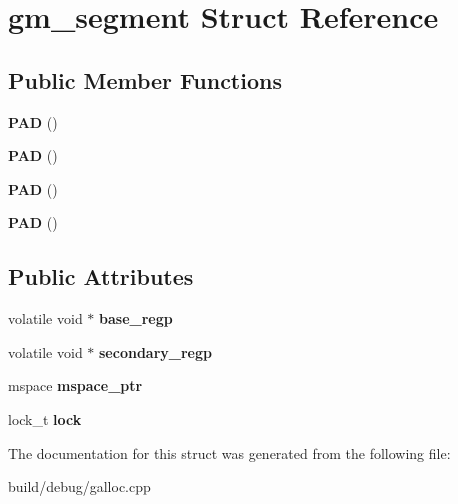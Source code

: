 \hypertarget{structgm__segment}{\section{gm\-\_\-segment Struct Reference}
\label{structgm__segment}
}
\subsection*{Public Member Functions}
\begin{DoxyCompactItemize}
\item 
\hypertarget{structgm__segment_a1ba3784ba1f090d5629cc17b2a228962}{{\bfseries P\-A\-D} ()}\label{structgm__segment_a1ba3784ba1f090d5629cc17b2a228962}

\item 
\hypertarget{structgm__segment_a1ba3784ba1f090d5629cc17b2a228962}{{\bfseries P\-A\-D} ()}\label{structgm__segment_a1ba3784ba1f090d5629cc17b2a228962}

\item 
\hypertarget{structgm__segment_a1ba3784ba1f090d5629cc17b2a228962}{{\bfseries P\-A\-D} ()}\label{structgm__segment_a1ba3784ba1f090d5629cc17b2a228962}

\item 
\hypertarget{structgm__segment_a1ba3784ba1f090d5629cc17b2a228962}{{\bfseries P\-A\-D} ()}\label{structgm__segment_a1ba3784ba1f090d5629cc17b2a228962}

\end{DoxyCompactItemize}
\subsection*{Public Attributes}
\begin{DoxyCompactItemize}
\item 
\hypertarget{structgm__segment_ac53e289c9dcab359d40d51ffca2343f1}{volatile void $\ast$ {\bfseries base\-\_\-regp}}\label{structgm__segment_ac53e289c9dcab359d40d51ffca2343f1}

\item 
\hypertarget{structgm__segment_aeb97797eba33fe58c8f2a1d4e5e0e4c0}{volatile void $\ast$ {\bfseries secondary\-\_\-regp}}\label{structgm__segment_aeb97797eba33fe58c8f2a1d4e5e0e4c0}

\item 
\hypertarget{structgm__segment_a1be98c862c410834087e1e3999bf5be3}{mspace {\bfseries mspace\-\_\-ptr}}\label{structgm__segment_a1be98c862c410834087e1e3999bf5be3}

\item 
\hypertarget{structgm__segment_a218ba2131e7c4eaefedb96f5c85a8574}{lock\-\_\-t {\bfseries lock}}\label{structgm__segment_a218ba2131e7c4eaefedb96f5c85a8574}

\end{DoxyCompactItemize}


The documentation for this struct was generated from the following file\-:\begin{DoxyCompactItemize}
\item 
build/debug/galloc.\-cpp\end{DoxyCompactItemize}
